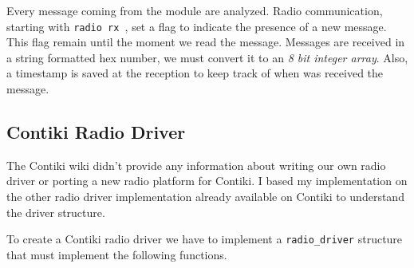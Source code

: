 Every message coming from the module are analyzed.
Radio communication, starting with \lstinline{radio rx }, set a flag to indicate the 
presence of a new message. 
This flag remain until the moment we read the message.
Messages are received in a string formatted hex number, we must convert it to an
\emph{8 bit integer array}. 
Also, a timestamp is saved at the reception to keep track of when was received the
message.



\subsection{Contiki Radio Driver}

The Contiki wiki didn't provide any information about writing our own radio driver
or porting a new radio platform for Contiki.
I based my implementation on the other radio driver implementation already
available on Contiki to understand the driver structure.

To create a Contiki radio driver we have to implement a \lstinline{radio_driver}
structure that must implement the following functions.

